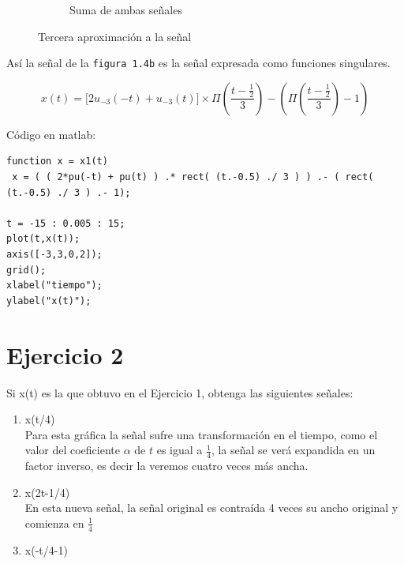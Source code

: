 \documentclass[10pt,a4paper]{report}
\begin{document}
\begin{figure}[H]
\begin{center}
\begin{subfigure}{0.5\textwidth}
\begin{center}
        \caption{Suma de ambas señales}
        \label{fig:Aprox3b}
      \end{center}
    \end{subfigure}
    
    \caption{Tercera aproximación a la señal}
    \label{fig:Aprox3}
  \end{center}
\end{figure}

Así la señal de la \texttt{figura 1.4b} es la señal expresada como funciones singulares.

\[ x(t)=\lbrack2u_{-3}(-t)+u_{-3}(t)\rbrack\times\Pi\left(\frac{t-{\displaystyle\frac12}}3\right)-(\Pi(\frac{t-{\displaystyle\frac12}}3)-1) \] 

Código en matlab:

\begin{lstlisting}
function x = x1(t)
 x = ( ( 2*pu(-t) + pu(t) ) .* rect( (t.-0.5) ./ 3 ) ) .- ( rect( (t.-0.5) ./ 3 ) .- 1);
         
t = -15 : 0.005 : 15;
plot(t,x(t));
axis([-3,3,0,2]);
grid();
xlabel("tiempo");
ylabel("x(t)"); 
\end{lstlisting}



\section{Ejercicio 2}
Si x(t) es la que obtuvo en el Ejercicio 1, obtenga las siguientes señales:\\
\begin{enumerate}
  \item x(t/4)\\
Para esta gráfica la señal sufre una transformación en el tiempo, como el valor del coeficiente $\alpha$ de $t$ es igual a $\frac{1}{4}$, la señal se verá expandida en un factor inverso, es decir la veremos cuatro veces más ancha.


  \item x(2t-1/4)\\
En esta nueva señal, la señal original es contraída 4 veces su ancho original y comienza en $ \frac{1}{4} $



  \item x(-t/4-1)
\end{enumerate}
\end{document}
